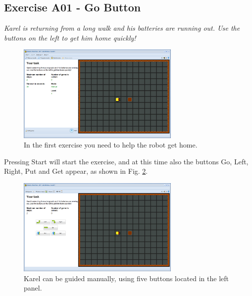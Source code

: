 \documentclass[article,A4,12pt]{llncs}
\begin{document}
\subsection{Exercise A01 - Go Button}

{\em Karel is returning from a long walk and his batteries are running out. 
Use the buttons on the left to get him home quickly! }

\begin{figure}[!ht]
\begin{center}
\includegraphics[width=0.7\textwidth]{img/a01.png}
\end{center}
\vspace{-4mm}
\caption{In the first exercise you need to help the robot get home.}
\label{fig:a01}
\end{figure}
\noindent
Pressing Start will start 
the exercise, and at this time also the buttons Go, Left, Right, Put and Get appear, 
as shown in Fig. \ref{fig:a01b}.

\newpage

\begin{figure}[!ht]
\begin{center}
\includegraphics[width=0.7\textwidth]{img/a01b.png}
\end{center}
\vspace{-4mm}
\caption{Karel can be guided manually, using five buttons located in the left panel.}
\label{fig:a01b}
\end{figure}
\end{document}
